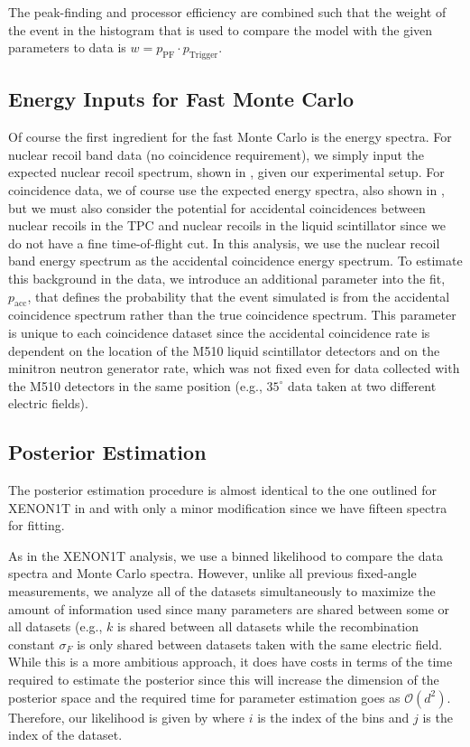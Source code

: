 The peak-finding and processor efficiency are combined such that the weight of the event in the histogram that is used to compare the model with the given parameters to data is $w = p_{\textrm{PF}} \cdot p_{\textrm{Trigger}}$.



\subsection{Energy Inputs for Fast Monte Carlo}


Of course the first ingredient for the fast Monte Carlo is the energy spectra.  For nuclear recoil band data (no coincidence requirement), we simply input the expected nuclear recoil spectrum, shown in , given our experimental setup.  For coincidence data, we of course use the expected energy spectra, also shown in , but we must also consider the potential for accidental coincidences between nuclear recoils in the TPC and nuclear recoils in the liquid scintillator since we do not have a fine time-of-flight cut.  In this analysis, we use the nuclear recoil band energy spectrum as the accidental coincidence energy spectrum.  To estimate this background in the data, we introduce an additional parameter into the fit, $p_{\textrm{acc}}$, that defines the probability that the event simulated is from the accidental coincidence spectrum rather than the true coincidence spectrum.  This parameter is unique to each coincidence dataset since the accidental coincidence rate is dependent on the location of the M510 liquid scintillator detectors and on the minitron neutron generator rate, which was not fixed even for data collected with the M510 detectors in the same position (e.g., $35^{\circ}$ data taken at two different electric fields).



\subsection{Posterior Estimation}


The posterior estimation procedure is almost identical to the one outlined for XENON1T in  and  with only a minor modification since we have fifteen spectra for fitting.  

As in the XENON1T analysis, we use a binned likelihood to compare the data spectra and Monte Carlo spectra.  However, unlike all previous fixed-angle measurements, we analyze all of the datasets simultaneously to maximize the amount of information used since many parameters are shared between some or all datasets (e.g., $k$ is shared between all datasets while the recombination constant $\sigma_F$ is only shared between datasets taken with the same electric field.  While this is a more ambitious approach, it does have costs in terms of the time required to estimate the posterior since this will increase the dimension of the posterior space and the required time for parameter estimation goes as $\mathcal{O}(d^2)$.  Therefore, our likelihood is given by  where $i$ is the index of the bins and $j$ is the index of the dataset.


